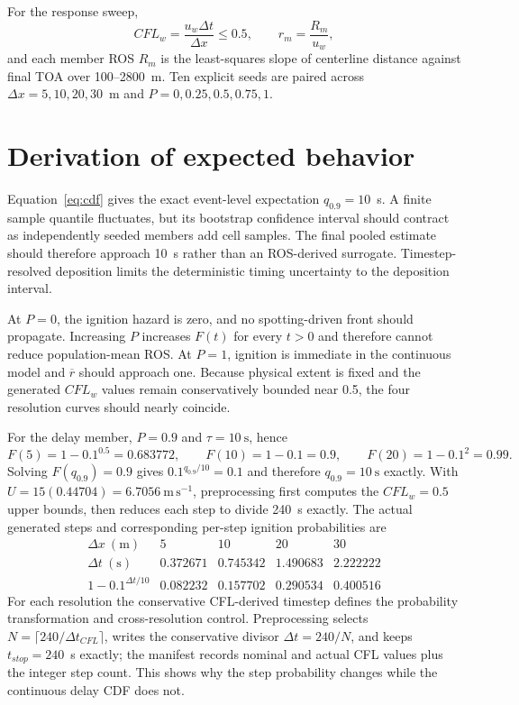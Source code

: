 For the response sweep,
\begin{equation}
 CFL_w=\frac{u_w\Delta t}{\Delta x}\leq0.5,
 \qquad r_m=\frac{R_m}{u_w},
 \label{eq:ros}
\end{equation}
and each member ROS $R_m$ is the least-squares slope of centerline distance
against final TOA over 100--2800~m. Ten explicit seeds are paired across
$\Delta x=5,10,20,30$~m and $P=0,0.25,0.5,0.75,1$.

\section{Derivation of expected behavior}
Equation~\ref{eq:cdf} gives the exact event-level expectation
$q_{0.9}=10$~s. A finite sample quantile fluctuates, but its bootstrap confidence
interval should contract as independently seeded members add cell samples. The
final pooled estimate should therefore approach 10~s rather than an ROS-derived
surrogate. Timestep-resolved deposition limits the deterministic timing
uncertainty to the deposition interval.

At $P=0$, the ignition hazard is zero, and no spotting-driven front should
propagate. Increasing $P$ increases $F(t)$ for every $t>0$ and therefore cannot
reduce population-mean ROS. At $P=1$, ignition is immediate in the continuous
model and $\overline r$ should approach one. Because physical extent is fixed and the generated
$CFL_w$ values remain conservatively bounded near 0.5, the four resolution curves should nearly coincide.

For the delay member, \(P=0.9\) and \(\tau=10~\mathrm{s}\), hence
\[
 F(5)=1-0.1^{0.5}=0.683772,\qquad
 F(10)=1-0.1=0.9,\qquad
 F(20)=1-0.1^2=0.99.
\]
Solving \(F(q_{0.9})=0.9\) gives
\(0.1^{q_{0.9}/10}=0.1\) and therefore
\(q_{0.9}=10~\mathrm{s}\) exactly.  With
\(U=15(0.44704)=6.7056~\mathrm{m\,s^{-1}}\), preprocessing first computes
the \(CFL_w=0.5\) upper bounds, then reduces each step to divide 240~s
exactly.  The actual generated steps and corresponding per-step ignition
probabilities are
\[
\begin{array}{c|rrrr}
\Delta x~(\mathrm{m})&5&10&20&30\\\hline
\Delta t~(\mathrm{s})&0.372671&0.745342&1.490683&2.222222\\
1-0.1^{\Delta t/10}&0.082232&0.157702&0.290534&0.400516
\end{array}
\]
For each resolution the conservative CFL-derived timestep defines the probability transformation and cross-resolution control. Preprocessing selects \(N=\lceil240/\Delta t_{CFL}\rceil\), writes the conservative divisor \(\Delta t=240/N\), and keeps \(t_{stop}=240\)~s exactly; the manifest records nominal and actual CFL values plus the integer step count. This shows why the step probability changes while the continuous delay CDF
does not.

